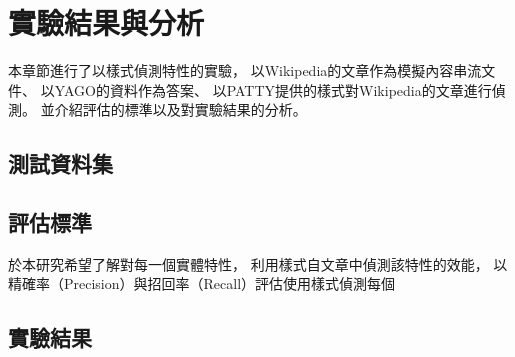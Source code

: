 %
%
%
\chapter{實驗結果與分析}
\label{c:exp}

本章節進行了以樣式偵測特性的實驗，
以Wikipedia的文章作為模擬內容串流文件、
以YAGO的資料作為答案、
以PATTY提供的樣式對Wikipedia的文章進行偵測。
並介紹評估的標準以及對實驗結果的分析。

\section{測試資料集}
\label{s:dataset}





\section{評估標準}
\label{s:eval}
於本研究希望了解對每一個實體特性，
利用樣式自文章中偵測該特性的效能，
以精確率（Precision）與招回率（Recall）評估使用樣式偵測每個

\section{實驗結果}
\label{s:result}

